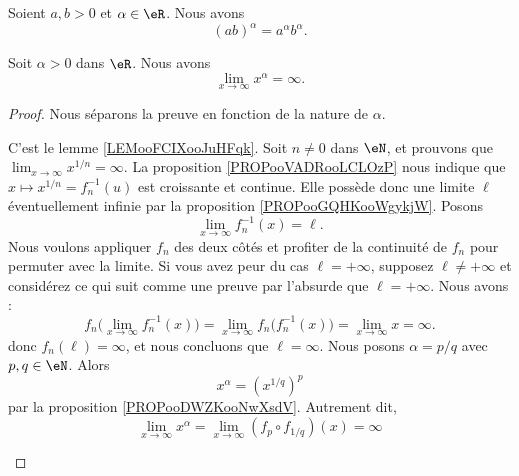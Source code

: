 \begin{proposition}	\label{PROPooURSHooFfEsFS}
	Soient \( a,b>0\) et \( \alpha\in \eR\). Nous avons
	\begin{equation}
		(ab)^{\alpha}=a^{\alpha}b^{\alpha}.
	\end{equation}
\end{proposition}


\begin{proposition}     \label{PROPooJRWCooGiXAYt}
	Soit \( \alpha>0\) dans \( \eR\). Nous avons
	\begin{equation}
		\lim_{x\to \infty} x^{\alpha}=\infty.
	\end{equation}
\end{proposition}

\begin{proof}
	Nous séparons la preuve en fonction de la nature de \( \alpha\).
	\begin{subproof}
		\spitem[Si \( \alpha\in \eN\)]
		C'est le lemme \ref{LEMooFCIXooJuHFqk}.
		\spitem[Si \( \alpha=1/n\)]
		Soit \( n\neq 0\) dans \( \eN\), et prouvons que \( \lim_{x\to \infty} x^{1/n}=\infty\). La proposition \ref{PROPooVADRooLCLOzP} nous indique que \( x\mapsto x^{1/n}=f_n^{-1}(u)\) est croissante et continue. Elle possède donc une limite \( \ell\) éventuellement infinie par la proposition \ref{PROPooGQHKooWgykjW}. Posons
		\begin{equation}
			\lim_{x\to \infty} f_n^{-1}(x)=\ell.
		\end{equation}
		Nous voulons appliquer \( f_n\) des deux côtés et profiter de la continuité de \( f_n\) pour permuter avec la limite. Si vous avez peur du cas \( \ell=+\infty\), supposez \( \ell\neq +\infty\) et considérez ce qui suit comme une preuve par l'absurde que \( \ell=+\infty\). Nous avons :
		\begin{equation}
			f_n\big( \lim_{x\to \infty} f_n^{-1}(x) \big)=\lim_{x\to \infty} f_n\big( f_n^{-1}(x) \big)=\lim_{x\to \infty} x=\infty.
		\end{equation}
		donc \( f_n(\ell)=\infty\), et nous concluons que \( \ell=\infty\).
		\spitem[Si \( \alpha\in \eQ\)]
		Nous posons \( \alpha=p/q\) avec \( p,q\in \eN\). Alors
		\begin{equation}
			x^{\alpha}=(x^{1/q})^p
		\end{equation}
		par la proposition \ref{PROPooDWZKooNwXsdV}. Autrement dit,
		\begin{equation}
			\lim_{x\to \infty} x^{\alpha}=\lim_{x\to \infty} (f_p\circ f_{1/q})(x)=\infty

\end{equation}
\end{subproof}
\end{proof}
